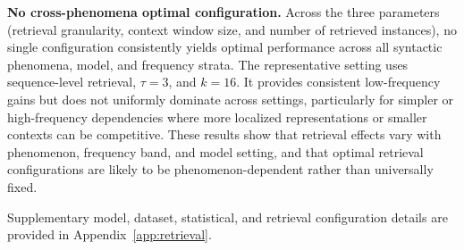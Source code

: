 \noindent \textbf{No cross-phenomena optimal configuration.} 
Across the three parameters (retrieval granularity, context window size, and number of retrieved instances), no single configuration consistently yields optimal performance across all syntactic phenomena, model, and frequency strata. The representative setting uses sequence-level retrieval, $\tau=3$, and $k=16$. It provides consistent low-frequency gains but does not uniformly dominate across settings, particularly for simpler or high-frequency dependencies where more localized representations or smaller contexts can be competitive. These results show that retrieval effects vary with phenomenon, frequency band, and model setting, and that optimal retrieval configurations are likely to be phenomenon-dependent rather than universally fixed.










Supplementary model, dataset, statistical, and retrieval configuration details are provided in Appendix~\ref{app:retrieval}.
